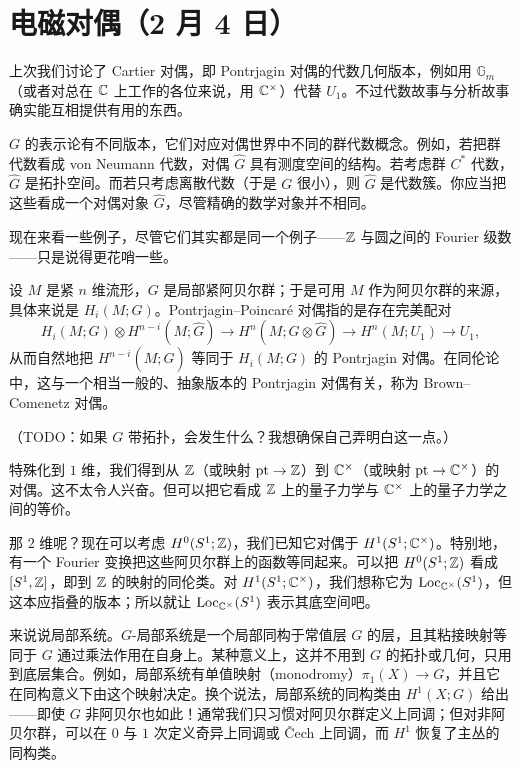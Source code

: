 \section[电磁对偶]{电磁对偶（2 月 4 日）}


上次我们讨论了 Cartier 对偶，即 Pontrjagin 对偶的代数几何版本，例如用 $\mathbb{G}_m$（或者对总在 $\mathbb{C}$ 上工作的各位来说，用 $\mathbb{C}^\times$）代替 $U_1$。不过代数故事与分析故事确实能互相提供有用的东西。

$G$ 的表示论有不同版本，它们对应对偶世界中不同的群代数概念。例如，若把群代数看成 von Neumann 代数，对偶 $\widehat{G}$ 具有测度空间的结构。若考虑群 $C^*$ 代数，$\widehat{G}$ 是拓扑空间。而若只考虑离散代数（于是 $G$ 很小），则 $\widehat{G}$ 是代数簇。你应当把这些看成一个对偶对象 $\widehat{G}$，尽管精确的数学对象并不相同。

现在来看一些例子，尽管它们其实都是同一个例子——$\mathbb{Z}$ 与圆之间的 Fourier 级数——只是说得更花哨一些。

\begin{example}
  设 $M$ 是紧 $n$ 维流形，$G$ 是局部紧阿贝尔群；于是可用 $M$ 作为阿贝尔群的来源，具体来说是 $H_i(M;G)$。Pontrjagin--Poincaré 对偶指的是存在完美配对
  \[
    H_i(M;G)\otimes H^{n-i}(M;\widehat{G})\longrightarrow H^n(M;G\otimes\widehat{G})\longrightarrow H^n(M;U_1)\longrightarrow U_1,
  \]
  从而自然地把 $H^{n-i}(M;\widehat{G})$ 等同于 $H_i(M;G)$ 的 Pontrjagin 对偶。在同伦论中，这与一个相当一般的、抽象版本的 Pontrjagin 对偶有关，称为 Brown--Comenetz 对偶。

  （TODO：如果 $G$ 带拓扑，会发生什么？我想确保自己弄明白这一点。）

  特殊化到 $1$ 维，我们得到从 $\mathbb{Z}$（或映射 $\mathrm{pt}\to\mathbb{Z}$）到 $\mathbb{C}^\times$（或映射 $\mathrm{pt}\to\mathbb{C}^\times$）的对偶。这不太令人兴奋。但可以把它看成 $\mathbb{Z}$ 上的量子力学与 $\mathbb{C}^\times$ 上的量子力学之间的等价。
\end{example}


那 $2$ 维呢？现在可以考虑 $H^0(S^1;\mathbb{Z})$，我们已知它对偶于 $H^1(S^1;\mathbb{C}^\times)$。特别地，有一个 Fourier 变换把这些阿贝尔群上的函数等同起来。可以把 $H^0(S^1;\mathbb{Z})$ 看成 $[S^1,\mathbb{Z}]$，即到 $\mathbb{Z}$ 的映射的同伦类。对 $H^1(S^1;\mathbb{C}^\times)$，我们想称它为 $\mathrm{Loc}_{\mathbb{C}^\times}(S^1)$，但这本应指叠的版本；所以就让 $\mathrm{Loc}_{\mathbb{C}^\times}(S^1)$ 表示其底空间吧。

来说说局部系统。$G$-局部系统是一个局部同构于常值层 $G$ 的层，且其粘接映射等同于 $G$ 通过乘法作用在自身上。某种意义上，这并不用到 $G$ 的拓扑或几何，只用到底层集合。例如，局部系统有单值映射（monodromy）$\pi_1(X)\to G$，并且它在同构意义下由这个映射决定。换个说法，局部系统的同构类由 $H^1(X;G)$ 给出——即使 $G$ 非阿贝尔也如此！通常我们只习惯对阿贝尔群定义上同调；但对非阿贝尔群，可以在 $0$ 与 $1$ 次定义奇异上同调或 Čech 上同调，而 $H^1$ 恢复了主丛的同构类。

